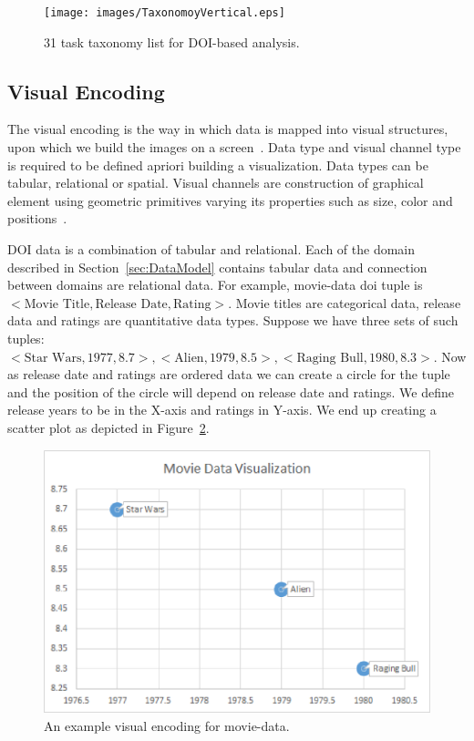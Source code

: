 \begin{figure}[!htb]
  \centering
  \texttt{[image: images/TaxonomoyVertical.eps]}
  \caption{\label{fig:taxonomy}%
           31 task taxonomy list for DOI-based analysis. }
\end{figure}

\subsection{Visual Encoding}
The visual encoding is the way in which data is mapped into visual structures, upon which we build the images on a screen~\cite{VEncodingDubakov}. Data type and visual channel type is required to be defined apriori building a visualization. Data types can be tabular, relational or spatial. Visual channels are construction of graphical element using geometric primitives varying its properties such as size, color and positions~\cite{munzner2011visualization}. 

DOI data is a combination of tabular and relational. Each of the domain described in Section~\ref{sec:DataModel} contains tabular data and connection between domains are relational data. For example, movie-data doi tuple is $<\text{Movie Title},\text{Release Date}, \text{Rating}>$. Movie titles are categorical data, release data and ratings are quantitative data types. Suppose we have three sets of such tuples: $<\text{Star Wars}, 1977, 8.7>, <\text{Alien}, 1979, 8.5>, <\text{Raging Bull}, 1980, 8.3>$. Now as release date and ratings are ordered data we can create a circle for the tuple and the position of the circle will depend on release date and ratings. We define release years to be in the X-axis and ratings in Y-axis. We end up creating a scatter plot as depicted in Figure~\ref{fig:ExampleVisualEncoding}.

\begin{figure}[!htb]
  \centering
  \includegraphics[width=\linewidth]{images/ExampleVisualEncoding.eps}
  \caption{\label{fig:ExampleVisualEncoding}%
           An example visual encoding for movie-data. }
\end{figure}

